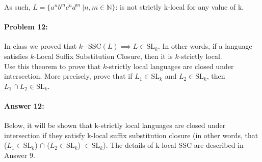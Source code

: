 \documentclass[10pt]{article}
\begin{document}
\noindent As such, $L= \{a^n b^m c^n d^m\ | n, m \in \mathbb{N} \}$: is not strictly k-local for any value of k.

\hrulefill
\paragraph{Problem 12:}

In class we proved that
$k\mathrm{-SSC}(L) \implies L \in \mathrm{SL}_k$. In other words, if a
language satisfies $k$-Local Suffix Substitution Closure, then it is
$k$-strictly local.\\

\noindent Use this theorem to prove that $k$-strictly local languages
are closed under intersection. More precisely, prove that if
$L_1 \in \mathrm{SL}_k$ and $L_2 \in \mathrm{SL}_k$, then
$L_1 \cap L_2 \in \mathrm{SL}_k$.

\paragraph{Answer 12:} Below, it will be shown that k-strictly local languages are closed under intersection if they satisfy k-local suffix substitution closure (in other words, that ($L_1 \in \mathrm{SL}_k$) $\cap$ ($L_2 \in \mathrm{SL}_k$) $\in  \mathrm{SL}_k$). The details of k-local SSC are described in Answer 9.
\end{document}
